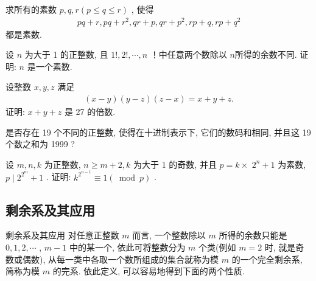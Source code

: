 \documentclass[aspectratio=169]{ctexbeamer}
\theoremstyle{definition}
\begin{document}
\begin{frame}[t]
	\begin{example}
		求所有的素数 $p ,  q ,  r(p \leqslant q \leqslant r)$ , 使得
		\begin{align*}
			p q+r, p q+r^{2}, q r+p, q r+p^{2}, r p+q, r p+q^{2}
		\end{align*}
		都是素数.
	\end{example}
\end{frame}

\begin{frame}[t]
	\begin{example}
		设 $n$ 为大于 1 的正整数, 且 $1!, 2!, \cdots, n$ ！中任意两个数除以 $n$所得的余数不同. 证明: $n$ 是一个素数.
	\end{example}
\end{frame}

\begin{frame}[t]
	\begin{example}
		设整数 $x ,  y ,  z$ 满足
		\begin{align}\label{eq:同余的概念与基本性质-例3}
			(x-y)(y-z)(z-x)=x+y+z .
		\end{align}
		证明: $x+y+z$ 是 27 的倍数.
	\end{example}
\end{frame}

\begin{frame}[t]
	\begin{example}
		是否存在 19 个不同的正整数, 使得在十进制表示下, 它们的数码和相同, 并且这 19 个数之和为 1999 ?
	\end{example}
\end{frame}

\begin{frame}[t]
	\begin{example}
		设 $m ,  n ,  k$ 为正整数,  $n \geqslant m+2, k$ 为大于 1 的奇数, 并且 $p=k \times$ $2^{n}+1$ 为素数,  $p \mid 2^{2^{m}}+1$ . 证明:  $k^{2^{n-1}} \equiv 1(\bmod p)$ .
	\end{example}
\end{frame}

\subsection{剩余系及其应用}\setcounter{theorem}{0}
\begin{frame}{剩余系及其应用}
对任意正整数 $m$ 而言, 一个整数除以 $m$ 所得的余数只能是 $0,1,2, \cdots$ ,  $m-1$ 中的某一个, 依此可将整数分为 $m$ 个类(例如 $m=2$ 时, 就是奇数或偶数), 从每一类中各取一个数所组成的集合就称为模 $m$ 的一个完全剩余系, 简称为模 $m$ 的完系. 依此定义, 可以容易地得到下面的两个性质.
\end{frame}
\end{document}
